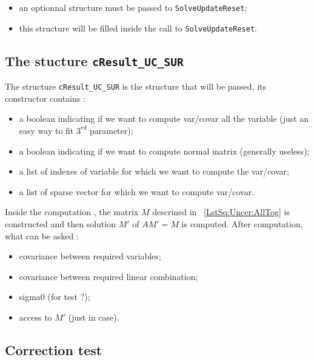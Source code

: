 \begin{itemize}
   \item an optionnal structure must be passed to  {\tt SolveUpdateReset};
   \item this structure  will be filled inside the call to  {\tt SolveUpdateReset}.
\end{itemize}

\subsection{The stucture {\tt cResult\_UC\_SUR}}

The structure {\tt cResult\_UC\_SUR} is the structure that will be passed,
its constructor contains :

\begin{itemize}
     \item a boolean indicating if we want to compute var/covar all the variable (just an easy way to fit $3^{rd}$ parameter);
     \item a boolean indicating if we want to compute normal matrix (generally useless);
     \item a list of indexes of variable for which we want to compute the var/covar;
     \item a list of sparse vector for which we want to compute var/covar.
\end{itemize}

Inside the computation , the matrix $M$ descrined in ~\ref{LstSq:Uncer:AllTog} is constructed
and then solution $M'$ of $AM' = M$ is computed.  After computation, what can be asked :


\begin{itemize}
      \item covariance between required variables;
      \item covariance between required linear combination;
      \item sigma0 (for test ?);
      \item access to $M'$ (just in case).
\end{itemize}


\subsection{Correction test}

